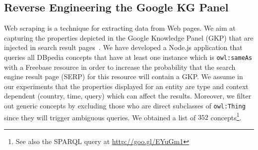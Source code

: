 \subsection{Reverse Engineering the Google KG Panel}
\label{sec:knowledge-graph}
Web scraping is a technique for extracting data from Web pages. We aim at capturing the properties depicted in the Google Knowledge Panel (GKP) that are injected in search result pages~\cite{Bergman2012}. We have developed a Node.js application that queries all DBpedia concepts that have at least one instance which is \texttt{owl:sameAs} with a Freebase resource in order to increase the probability that the search engine result page (SERP) for this resource will contain a GKP. We assume in our experiments that the properties displayed for an entity are type and context dependent (country, time, query) which can affect the results. Moreover, we filter out generic concepts by excluding those who are direct subclasses of \texttt{owl:Thing} since they will trigger ambiguous queries. We obtained a list of $352$ concepts\footnote{See also the SPARQL query at \url{http://goo.gl/EYuGm1}}.

